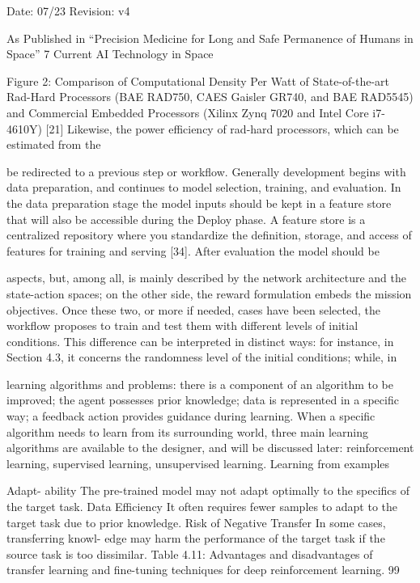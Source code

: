 \documentclass[a4paper,12pt]{article}
\begin{document}
Date: 07/23 
Revision: v4 
 
 
 
As Published in “Precision Medicine for Long and Safe Permanence of Humans in Space” 
7 
Current AI Technology in Space 
 
 
 
Figure 2: Comparison of Computational Density Per Watt of State-of-the-art Rad-Hard Processors (BAE RAD750, 
CAES Gaisler GR740, and BAE RAD5545) and Commercial Embedded Processors (Xilinx Zynq 7020 and Intel 
Core i7-4610Y) [21] 
Likewise, the power efficiency of rad-hard processors, which can be estimated from the

be redirected to a previous step or workﬂow. Generally development begins with data preparation, and continues to
model selection, training, and evaluation. In the data preparation stage the model inputs should be kept in a feature store
that will also be accessible during the Deploy phase. A feature store is a centralized repository where you standardize
the deﬁnition, storage, and access of features for training and serving [34]. After evaluation the model should be

aspects, but, among all, is mainly described by the network architecture and
the state-action spaces; on the other side, the reward formulation embeds the
mission objectives. Once these two, or more if needed, cases have been selected,
the workflow proposes to train and test them with different levels of initial
conditions. This difference can be interpreted in distinct ways: for instance, in
Section 4.3, it concerns the randomness level of the initial conditions; while, in

learning algorithms and problems: there is a component of an algorithm to be 
improved; the agent possesses prior knowledge; data is represented in a specific 
way; a feedback action provides guidance during learning. When a specific 
algorithm needs to learn from its surrounding world, three main learning algorithms 
are available to the designer, and will be discussed later: reinforcement learning, 
supervised learning, unsupervised learning. 
Learning from examples

Adapt-
ability
The pre-trained model may not
adapt optimally to the specifics of
the target task.
Data Efficiency
It often requires fewer samples to
adapt to the target task due to prior
knowledge.
Risk of Negative
Transfer
In some cases, transferring knowl-
edge may harm the performance of
the target task if the source task is
too dissimilar.
Table 4.11: Advantages and disadvantages of transfer learning and fine-tuning techniques for deep reinforcement learning.
99
\end{document}
